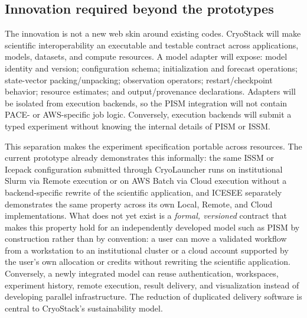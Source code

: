 \subsection{Innovation required beyond the prototypes}

The innovation is not a new web skin around existing codes. CryoStack will
make scientific interoperability an executable and testable contract across
applications, models, datasets, and compute resources. A model adapter will
expose: model identity and version; configuration schema;
initialization and forecast operations; state-vector packing/unpacking;
observation operators; restart/checkpoint behavior; resource estimates; and
output/provenance declarations. Adapters will be isolated from execution
backends, so the PISM integration will not contain PACE- or AWS-specific job
logic. Conversely, execution backends will submit a typed experiment without
knowing the internal details of PISM or ISSM.

This separation makes the experiment specification portable across resources.
The current prototype already demonstrates this informally: the same ISSM or
Icepack configuration submitted through CryoLauncher runs on institutional
Slurm via Remote execution or on AWS Batch via Cloud execution without a
backend-specific rewrite of the scientific application, and ICESEE
separately demonstrates the same property across its own Local, Remote, and
Cloud implementations. What does not yet
exist is a \emph{formal, versioned} contract that makes this property hold
for an independently developed model such as PISM by construction rather than
by convention: a user can move a validated workflow from a workstation to an
institutional cluster or a cloud account supported by the user's own
allocation or credits without rewriting the scientific application. Conversely,
a newly integrated model can reuse authentication, workspaces, experiment
history, remote execution, result delivery, and visualization instead of
developing parallel infrastructure. The reduction of duplicated delivery
software is central to CryoStack's sustainability model.

